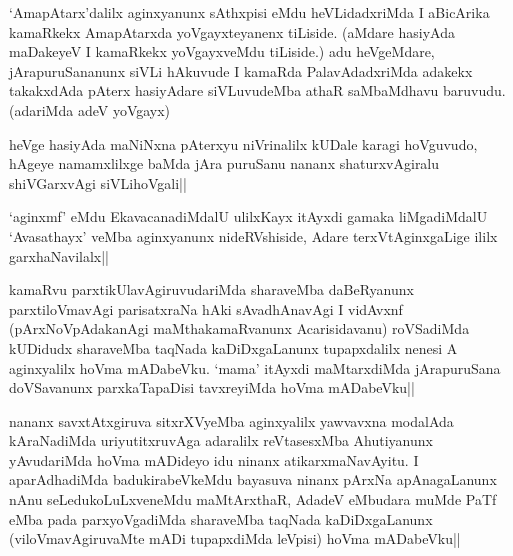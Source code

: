 \begin{artha}
`AmapAtarx'dalilx aginxyanunx sAthxpisi eMdu heVLidadxriMda I 
aBicArika kamaRkekx AmapAtarxda yoVgayxteyanenx tiLiside. (aMdare 
hasiyAda maDakeyeV I kamaRkekx yoVgayxveMdu tiLiside.) adu heVgeMdare, 
jArapuruSananunx siVLi hAkuvude I kamaRda PalavAdadxriMda adakekx 
takakxdAda pAterx hasiyAdare siVLuvudeMba athaR saMbaMdhavu baruvudu. 
(adariMda adeV yoVgayx)
\end{artha}


\begin{artha}
heVge hasiyAda maNiNxna pAterxyu niVrinalilx kUDale karagi hoVguvudo, 
hAgeye namamxlilxge baMda jAra puruSanu nananx shaturxvAgiralu 
shiVGarxvAgi siVLihoVgali|| 
\end{artha}


\begin{artha}
`aginxmf' eMdu EkavacanadiMdalU ulilxKayx itAyxdi gamaka liMgadiMdalU 
`Avasathayx' veMba aginxyanunx nideRVshiside, Adare terxVtAginxgaLige 
ililx garxhaNavilalx||
\end{artha}


\begin{artha}
kamaRvu parxtikUlavAgiruvudariMda sharaveMba daBeRyanunx 
parxtiloVmavAgi parisatxraNa hAki sAvadhAnavAgi I vidAvxnf 
(pArxNoVpAdakanAgi maMthakamaRvanunx Acarisidavanu) roVSadiMda 
kUDidudx sharaveMba taqNada kaDiDxgaLanunx tupapxdalilx nenesi A 
aginxyalilx hoVma mADabeVku. `mama' itAyxdi maMtarxdiMda jArapuruSana 
doVSavanunx parxkaTapaDisi tavxreyiMda hoVma mADabeVku||
\end{artha}


\begin{artha}
nananx savxtAtxgiruva sitxrXVyeMba aginxyalilx yawvavxna modalAda 
kAraNadiMda uriyutitxruvAga adaralilx reVtasesxMba Ahutiyanunx 
yAvudariMda hoVma mADideyo idu ninanx atikarxmaNavAyitu. I 
aparAdhadiMda badukirabeVkeMdu bayasuva ninanx pArxNa apAnagaLanunx 
nAnu seLedukoLuLxveneMdu maMtArxthaR, AdadeV eMbudara muMde PaTf eMba 
pada parxyoVgadiMda sharaveMba taqNada kaDiDxgaLanunx 
(viloVmavAgiruvaMte mADi tupapxdiMda leVpisi) hoVma mADabeVku||
\end{artha}

